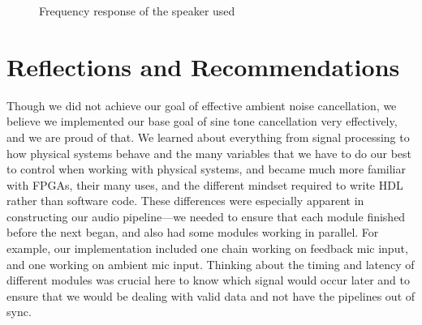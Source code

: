 \documentclass{fpgairpods}
\begin{document}
\begin{figure}
    \centering
    \caption{Frequency response of the speaker used}
    \label{chart:speaker_response}
\end{figure}

\section{Reflections and Recommendations}



Though we did not achieve our goal of effective ambient noise cancellation, we believe we implemented our base goal of sine tone cancellation very effectively, and we are proud of that. We learned about everything from signal processing to how physical systems behave and the many variables that we have to do our best to control when working with physical systems, and became much more familiar with FPGAs, their many uses, and the different mindset required to write HDL rather than software code. These differences were especially apparent in constructing our audio pipeline---we needed to ensure that each module finished before the next began, and also had some modules working in parallel. For example, our implementation included one chain working on feedback mic input, and one working on ambient mic input. Thinking about the timing and latency of different modules was crucial here to know which  signal would occur later and to ensure that we would be dealing with valid data and not have the pipelines out of sync. 
\end{document}
